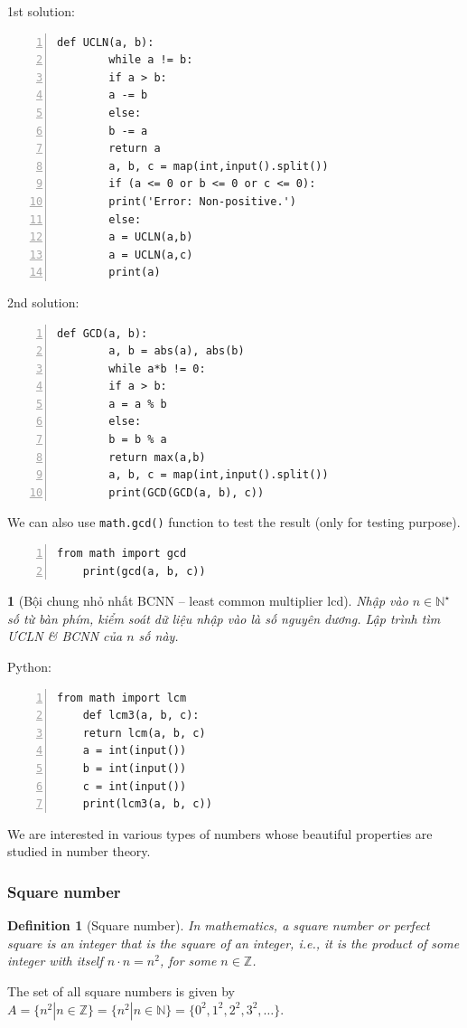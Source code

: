 \documentclass{article}
\newtheorem{baitoan}{}
\newtheorem{definition}{Definition}
\begin{document}
\begin{multicols}{2}
	1st solution:
	\begin{Verbatim}[numbers=left,xleftmargin=5mm]
		def UCLN(a, b):
		while a != b:
		if a > b:
		a -= b
		else:
		b -= a
		return a
		a, b, c = map(int,input().split())
		if (a <= 0 or b <= 0 or c <= 0):
		print('Error: Non-positive.')
		else:
		a = UCLN(a,b)
		a = UCLN(a,c)
		print(a)
	\end{Verbatim}
	\columnbreak
	2nd solution:
	\begin{Verbatim}[numbers=left,xleftmargin=5mm]
		def GCD(a, b):
		a, b = abs(a), abs(b)
		while a*b != 0:
		if a > b:
		a = a % b
		else:
		b = b % a
		return max(a,b)
		a, b, c = map(int,input().split())
		print(GCD(GCD(a, b), c))
	\end{Verbatim}
\end{multicols}
We can also use \texttt{math.gcd()} function to test the result (only for testing purpose).
\begin{Verbatim}[numbers=left,xleftmargin=5mm]
	from math import gcd
	print(gcd(a, b, c))
\end{Verbatim}

\begin{baitoan}[Bội chung nhỏ nhất BCNN -- least common multiplier lcd]
	Nhập vào $n\in\mathbb{N}^\star$ số từ bàn phím, kiểm soát dữ liệu nhập vào là số nguyên dương. Lập trình tìm \emph{ƯCLN} \& \emph{BCNN} của $n$ số này.
\end{baitoan}
Python:
\begin{Verbatim}[numbers=left,xleftmargin=5mm]
	from math import lcm
	def lcm3(a, b, c):
	return lcm(a, b, c)
	a = int(input())
	b = int(input())
	c = int(input())
	print(lcm3(a, b, c))
\end{Verbatim}
We are interested in various types of numbers whose beautiful properties are studied in number theory.

\subsubsection{Square number}

\begin{definition}[Square number]
	In mathematics, a \emph{square number} or \emph{perfect square} is an integer that is the square of an integer, i.e., it is the product of some integer with itself $n\cdot n = n^2$, for some $n\in\mathbb{Z}$. 
\end{definition}
The set of all square numbers is given by $A = \{n^2|n\in\mathbb{Z}\} = \{n^2|n\in\mathbb{N}\} = \{0^2,1^2,2^2,3^2,\ldots\}$.
\end{document}

